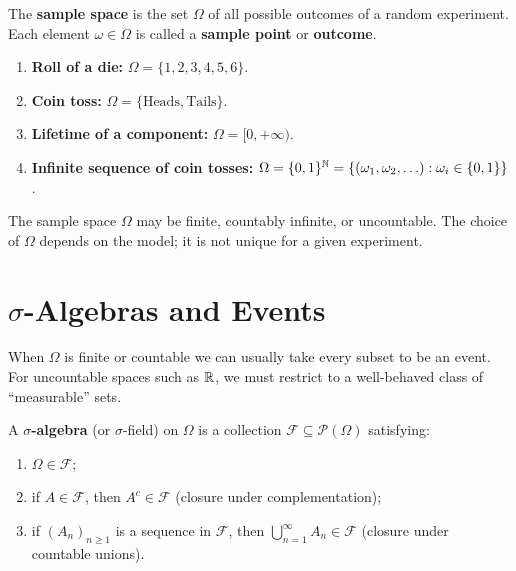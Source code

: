 \begin{definition}
The \textbf{sample space} is the set $\Omega$ of all possible outcomes of a
random experiment. Each element $\omega \in \Omega$ is called a
\textbf{sample point} or \textbf{outcome}.
\end{definition}

\begin{example}
\begin{enumerate}
    \item \textbf{Roll of a die:} $\Omega = \{1, 2, 3, 4, 5, 6\}$.
    \item \textbf{Coin toss:} $\Omega = \{\text{Heads}, \text{Tails}\}$.
    \item \textbf{Lifetime of a component:} $\Omega = [0, +\infty)$.
    \item \textbf{Infinite sequence of coin tosses:}
          $\Omega = \{0, 1\}^{\mathbb{N}} = \{(\omega_1, \omega_2, \ldots) : \omega_i \in \{0,1\}\}$.
\end{enumerate}
\end{example}

\begin{remark}
The sample space $\Omega$ may be finite, countably infinite, or uncountable.
The choice of $\Omega$ depends on the model; it is not unique for a given experiment.
\end{remark}

\section{$\sigma$-Algebras and Events}

When $\Omega$ is finite or countable we can usually take every subset to be an
event. For uncountable spaces such as $\mathbb{R}$, we must restrict to a well-behaved
class of ``measurable'' sets.

\begin{definition}
\label{def:sigma_algebra}
A \textbf{$\sigma$-algebra} (or $\sigma$-field) on $\Omega$ is a collection
$\mathcal{F} \subseteq \mathcal{P}(\Omega)$ satisfying:
\begin{enumerate}[label=(\roman*)]
    \item $\Omega \in \mathcal{F}$;
    \item if $A \in \mathcal{F}$, then $A^c \in \mathcal{F}$
          \quad (closure under complementation);
    \item if $(A_n)_{n \geq 1}$ is a sequence in $\mathcal{F}$, then
          $\displaystyle\bigcup_{n=1}^{\infty} A_n \in \mathcal{F}$
          \quad (closure under countable unions).
\end{enumerate}
\end{definition}

